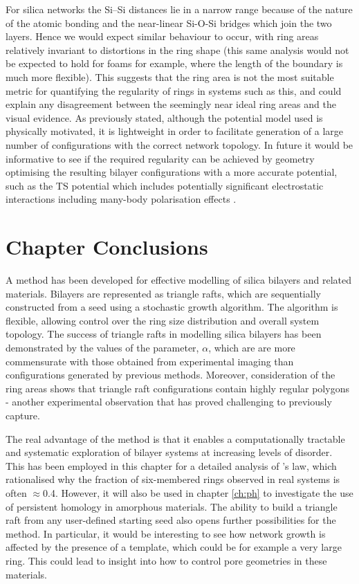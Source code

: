 For silica networks the Si\---Si distances lie in a narrow range because of the nature of the atomic bonding and the near\--linear Si-O-Si bridges
which join the two layers. 
Hence we would expect similar behaviour to occur, with ring areas relatively invariant to distortions in the ring shape (this same analysis would not be expected to hold for foams for example, where the length of the boundary is much more flexible). 
This suggests that the ring area is not the most suitable metric for quantifying the regularity of rings in systems such as this, and could explain any disagreement between the seemingly near ideal ring areas and the visual evidence. 
As previously stated, although the potential model used is physically motivated, it is lightweight in order to facilitate generation of a large number of configurations with the correct network topology. 
In future it would be informative to see if the required regularity can be achieved by geometry optimising the resulting bilayer configurations with a more accurate potential, such as the TS potential which includes potentially significant electrostatic interactions including many-body polarisation effects \cite{Tangney2002}.

\section{Chapter Conclusions}

A method has been developed for effective modelling of silica bilayers and related materials.
Bilayers are represented as triangle rafts, which are sequentially constructed from a seed using a stochastic growth algorithm.
The algorithm is flexible, allowing control over the ring size distribution and overall system topology.
The success of triangle rafts in modelling silica bilayers has been demonstrated by the values of the \aw{} parameter, $\alpha$, which are are more commensurate with those obtained from experimental imaging than configurations generated by previous methods.
Moreover, consideration of the ring areas shows that triangle raft configurations contain highly regular polygons - another experimental observation that has proved challenging to previously capture.

The real advantage of the method is that it enables a computationally tractable and systematic exploration of bilayer systems at increasing levels of disorder.
This has been employed in this chapter for a detailed analysis of \lm's
law, which rationalised why the fraction of six-membered rings observed
in real systems is often $\approx$0.4. 
However, it will also be used in chapter \ref{ch:ph} to investigate the use of persistent homology in amorphous materials.
The ability to build a triangle raft from any user\--defined starting seed also opens further possibilities for the method.
In particular, it would be interesting to see how network growth is affected by the presence of a template, which could be for example a very large ring.
This could lead to insight into how to control pore geometries in these materials.




